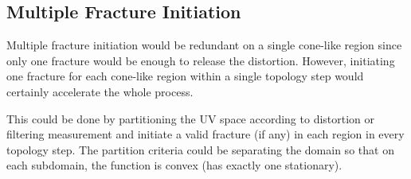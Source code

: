


\subsection{Multiple Fracture Initiation}
\minchen{[TODO]}

Multiple fracture initiation would be redundant on a single cone-like region since only one fracture would be enough to release the distortion. However, initiating one fracture for each cone-like region within a single topology step would certainly accelerate the whole process.

This could be done by partitioning the UV space according to distortion or filtering measurement and initiate a valid fracture (if any) in each region in every topology step. The partition criteria could be separating the domain so that on each subdomain, the function is convex (has exactly one stationary).